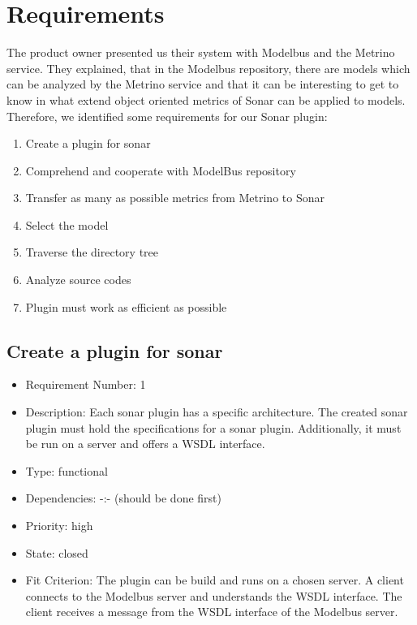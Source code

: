 \section{Requirements}
The product owner presented us their system with Modelbus and the Metrino service. They explained, that in the Modelbus repository, there are models which can be analyzed by the Metrino service and that it can be interesting to get to know in what extend object oriented metrics of Sonar can be applied to models. Therefore, we identified some requirements for our Sonar plugin:
\begin{enumerate}
\item Create a plugin for sonar
\item Comprehend and cooperate with ModelBus repository
\item Transfer as many as possible metrics from Metrino to Sonar
\item Select the model
\item Traverse the directory tree
\item Analyze source codes
\item Plugin must work as efficient as possible
\end{enumerate}

\subsection{Create a plugin for sonar}
\begin{itemize}
\item Requirement Number: 1
\item Description: Each sonar plugin has a specific architecture. The created sonar plugin must hold the specifications for a sonar plugin. Additionally, it must be run on a server and offers a WSDL interface.
\item Type: functional
\item Dependencies: -:- (should be done first)
\item Priority: high
\item State: closed
\item Fit Criterion: The plugin can be build and runs on a chosen server. A client connects to the Modelbus server and understands the WSDL interface. The client receives a message from the WSDL interface of the Modelbus server.
\end{itemize}

